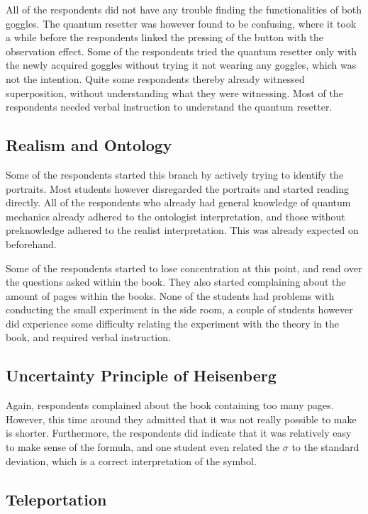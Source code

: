 \documentclass[11pt,twoside]{report} %
\begin{document}
All of the respondents did not have any trouble finding the functionalities of both goggles. The quantum resetter was however found to be confusing, where it took a while before the respondents linked the pressing of the button with the observation effect. Some of the respondents tried the quantum resetter only with the newly acquired goggles without trying it not wearing any goggles, which was not the intention. Quite some respondents thereby already witnessed superposition, without understanding what they were witnessing. Most of the respondents needed verbal instruction to understand the quantum resetter.

\subsection{Realism and Ontology}

Some of the respondents started this branch by actively trying to identify the portraits. Most students however disregarded the portraits and started reading directly. All of the respondents who already had general knowledge of quantum mechanics already adhered to the ontologist interpretation, and those without preknowledge adhered to the realist interpretation. This was already expected on beforehand.

Some of the respondents started to lose concentration at this point, and read over the questions asked within the book. They also started complaining about the amount of pages within the books. None of the students had problems with conducting the small experiment in the side room, a couple of students however did experience some difficulty relating the experiment with the theory in the book, and required verbal instruction.

\subsection{Uncertainty Principle of Heisenberg}

Again, respondents complained about the book containing too many pages. However, this time around they admitted that it was not really possible to make is shorter. Furthermore, the respondents did indicate that it was relatively easy to make sense of the formula, and one student even related the $\sigma$ to the standard deviation, which is a correct interpretation of the symbol.

\subsection{Teleportation}
\end{document}
